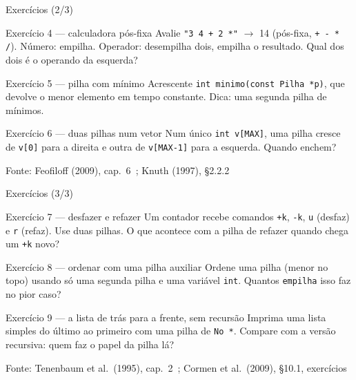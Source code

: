 \documentclass[aspectratio=169]{beamer}
\newcommand{\fonte}[1]{\vfill\hfill{\scriptsize\textcolor{UFSGray}{Fonte: #1}}}
\begin{document}
\begin{frame}{Exercícios (2/3)}
  \footnotesize
  \begin{block}{Exercício 4 --- calculadora pós-fixa}
    Avalie \texttt{"3 4 + 2 *"} $\to$ 14 (pós-fixa, \texttt{+ - * /}).
    Número: empilha. Operador: desempilha dois, empilha o resultado. Qual
    dos dois é o operando da esquerda?
  \end{block}
  \begin{block}{Exercício 5 --- pilha com mínimo}
    Acrescente \texttt{int minimo(const Pilha *p)}, que devolve o menor
    elemento em tempo constante. Dica: uma segunda pilha de mínimos.
  \end{block}
  \begin{block}{Exercício 6 --- duas pilhas num vetor}
    Num único \texttt{int v[MAX]}, uma pilha cresce de \texttt{v[0]} para a
    direita e outra de \texttt{v[MAX-1]} para a esquerda. Quando enchem?
  \end{block}
  \fonte{Feofiloff (2009), cap.~6~\cite{feofiloff2009algoritmos};
    Knuth (1997), §2.2.2~\cite{knuth1997art}}
\end{frame}

\begin{frame}{Exercícios (3/3)}
  \footnotesize
  \begin{block}{Exercício 7 --- desfazer e refazer}
    Um contador recebe comandos \texttt{+k}, \texttt{-k}, \texttt{u}
    (desfaz) e \texttt{r} (refaz). Use duas pilhas. O que acontece com a
    pilha de refazer quando chega um \texttt{+k} novo?
  \end{block}
  \begin{block}{Exercício 8 --- ordenar com uma pilha auxiliar}
    Ordene uma pilha (menor no topo) usando só uma segunda pilha e uma
    variável \texttt{int}. Quantos \texttt{empilha} isso faz no pior caso?
  \end{block}
  \begin{block}{Exercício 9 --- a lista de trás para a frente, sem recursão}
    Imprima uma lista simples do último ao primeiro com uma pilha de
    \texttt{No *}. Compare com a versão recursiva: quem faz o papel da
    pilha lá?
  \end{block}
  \fonte{Tenenbaum et al.\ (1995), cap.~2~\cite{tenenbaum1995estruturas};
    Cormen et al.\ (2009), §10.1, exercícios~\cite{cormen2009introduction}}
\end{frame}
\end{document}
